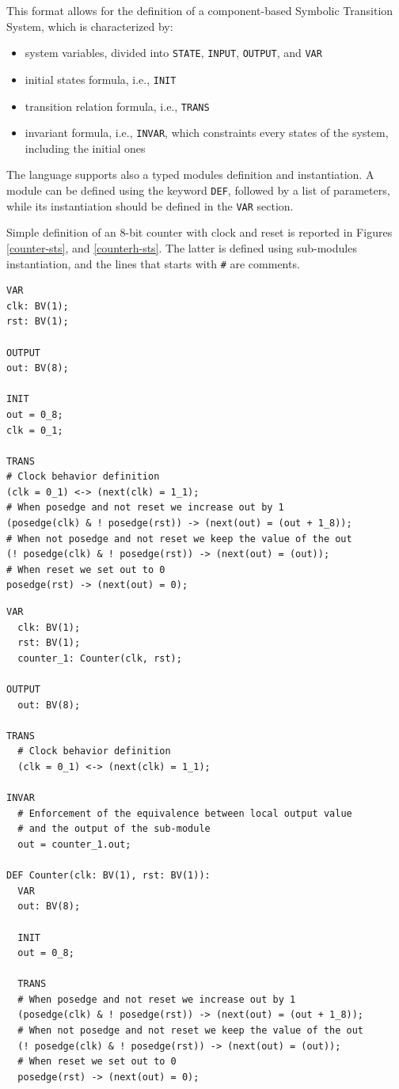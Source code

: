 \documentclass{article}
\theoremstyle{definition}
\begin{document}
This format allows for the definition of a component-based Symbolic
Transition System, which is characterized by:

\begin{itemize}
\item system variables, divided into \texttt{STATE}, \texttt{INPUT},
  \texttt{OUTPUT}, and \texttt{VAR}
\item initial states formula, i.e., \texttt{INIT}
\item transition relation formula, i.e., \texttt{TRANS}
\item invariant formula, i.e., \texttt{INVAR}, which constraints every
  states of the system, including the initial ones
\end{itemize}

The language supports also a typed modules definition and
instantiation. A module can be defined using the keyword \texttt{DEF}, followed
by a list of parameters, while its instantiation should be defined in
the \texttt{VAR} section.

Simple definition of an 8-bit counter with clock and reset is reported
in Figures \ref{counter-sts}, and \ref{counterh-sts}. The latter is
defined using sub-modules instantiation, and the lines that starts
with \texttt{\#} are comments.

\begin{lstlisting}[frame=single,language=sts,caption=Counter example,label=counter-sts]
VAR
clk: BV(1);
rst: BV(1);

OUTPUT
out: BV(8);

INIT
out = 0_8;
clk = 0_1;

TRANS
# Clock behavior definition
(clk = 0_1) <-> (next(clk) = 1_1);
# When posedge and not reset we increase out by 1
(posedge(clk) & ! posedge(rst)) -> (next(out) = (out + 1_8));
# When not posedge and not reset we keep the value of the out
(! posedge(clk) & ! posedge(rst)) -> (next(out) = (out));
# When reset we set out to 0
posedge(rst) -> (next(out) = 0);
\end{lstlisting}


\begin{lstlisting}[frame=single,language=sts,caption=Counter example (hierarchical),label=counterh-sts]
VAR
  clk: BV(1);
  rst: BV(1);
  counter_1: Counter(clk, rst);

OUTPUT
  out: BV(8);

TRANS
  # Clock behavior definition
  (clk = 0_1) <-> (next(clk) = 1_1);

INVAR
  # Enforcement of the equivalence between local output value
  # and the output of the sub-module
  out = counter_1.out;

DEF Counter(clk: BV(1), rst: BV(1)):
  VAR
  out: BV(8);

  INIT
  out = 0_8;

  TRANS
  # When posedge and not reset we increase out by 1
  (posedge(clk) & ! posedge(rst)) -> (next(out) = (out + 1_8));
  # When not posedge and not reset we keep the value of the out
  (! posedge(clk) & ! posedge(rst)) -> (next(out) = (out));
  # When reset we set out to 0
  posedge(rst) -> (next(out) = 0);
\end{lstlisting}
\end{document}
